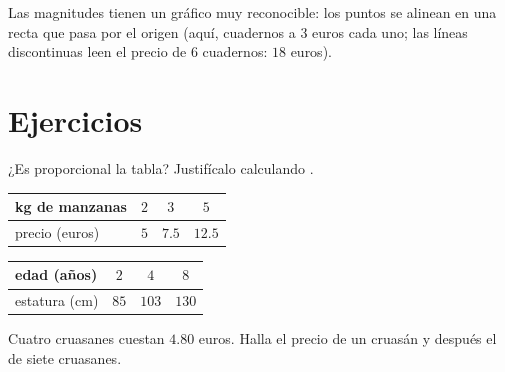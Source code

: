 \begin{omfigure}

{\small Las magnitudes  tienen un gráfico muy reconocible: los
puntos se alinean en una recta que pasa por el origen (aquí, cuadernos a
$3$ euros cada uno; las líneas discontinuas leen el precio de $6$ cuadernos: $18$
euros).}
\end{omfigure}

\section{Ejercicios}

\begin{exercise}[$\star$]\label{exo:g6:propdata:1}
¿Es proporcional la tabla? Justifícalo calculando .
\begin{center}
\renewcommand{\arraystretch}{1.2}
\begin{tabular}{l|ccc}
kg de manzanas & $2$ & $3$ & $5$ \\
\hline
precio (euros) & $5$ & $7.5$ & $12.5$ \\
\end{tabular}
\qquad
\begin{tabular}{l|ccc}
edad (años) & $2$ & $4$ & $8$ \\
\hline
estatura (cm) & $85$ & $103$ & $130$ \\
\end{tabular}
\end{center}
\end{exercise}

\begin{exercise}[$\star$]\label{exo:g6:propdata:2}
Cuatro cruasanes cuestan $4.80$ euros. Halla el precio de un cruasán
y después el de siete cruasanes.
\end{exercise}

